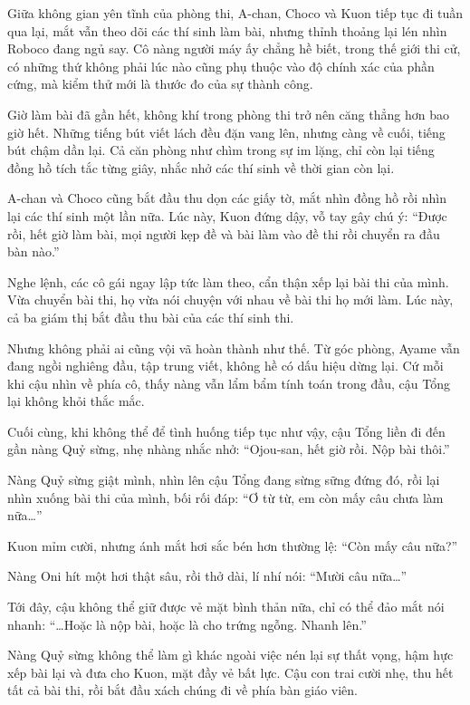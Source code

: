 \documentclass[../main.tex]{subfiles}
\begin{document}
Giữa không gian yên tĩnh của phòng thi, A-chan, Choco và Kuon tiếp tục đi tuần qua lại, mắt vẫn theo dõi các thí sinh làm bài, nhưng thỉnh thoảng lại lén nhìn Roboco đang ngủ say. Cô nàng người máy ấy chẳng hề biết, trong thế giới thi cử, có những thứ không phải lúc nào cũng phụ thuộc vào độ chính xác của phần cứng, mà kiểm thử mới là thước đo của sự thành công.

\ct

Giờ làm bài đã gần hết, không khí trong phòng thi trở nên căng thẳng hơn bao giờ hết. Những tiếng bút viết lách đều đặn vang lên, nhưng càng về cuối, tiếng bút chậm dần lại. Cả căn phòng như chìm trong sự im lặng, chỉ còn lại tiếng đồng hồ tích tắc từng giây, nhắc nhở các thí sinh về thời gian còn lại.

A-chan và Choco cũng bắt đầu thu dọn các giấy tờ, mắt nhìn đồng hồ rồi nhìn lại các thí sinh một lần nữa. Lúc này, Kuon đứng dậy, vỗ tay gây chú ý: ``Được rồi, hết giờ làm bài, mọi người kẹp đề và bài làm vào đề thi rồi chuyển ra đầu bàn nào.''

Nghe lệnh, các cô gái ngay lập tức làm theo, cẩn thận xếp lại bài thi của mình. Vừa chuyển bài thi, họ vừa nói chuyện với nhau về bài thi họ mới làm. Lúc này, cả ba giám thị bắt đầu thu bài của các thí sinh thi.

Nhưng không phải ai cũng vội vã hoàn thành như thế. Từ góc phòng, Ayame vẫn đang ngồi nghiêng đầu, tập trung viết, không hề có dấu hiệu dừng lại. Cứ mỗi khi cậu nhìn về phía cô, thấy nàng vẫn lẩm bẩm tính toán trong đầu, cậu Tổng lại không khỏi thắc mắc.

Cuối cùng, khi không thể để tình huống tiếp tục như vậy, cậu Tổng liền đi đến gần nàng Quỷ sừng, nhẹ nhàng nhắc nhở: ``Ojou-san, hết giờ rồi. Nộp bài thôi.''

Nàng Quỷ sừng giật mình, nhìn lên cậu Tổng đang sừng sững đứng đó, rồi lại nhìn xuống bài thi của mình, bối rối đáp: ``Ơ từ từ, em còn mấy câu chưa làm nữa\dots''

Kuon mỉm cười, nhưng ánh mắt hơi sắc bén hơn thường lệ: ``Còn mấy câu nữa?''

Nàng Oni hít một hơi thật sâu, rồi thở dài, lí nhí nói: ``Mười câu nữa\dots''

Tới đây, cậu không thể giữ được vẻ mặt bình thản nữa, chỉ có thể đảo mắt nói nhanh: ``\dots Hoặc là nộp bài, hoặc là cho trứng ngỗng. Nhanh lên.''

Nàng Quỷ sừng không thể làm gì khác ngoài việc nén lại sự thất vọng, hậm hực xếp bài lại và đưa cho Kuon, mặt đầy vẻ bất lực. Cậu con trai cười nhẹ, thu hết tất cả bài thi, rồi bắt đầu xách chúng đi về phía bàn giáo viên.
\end{document}
